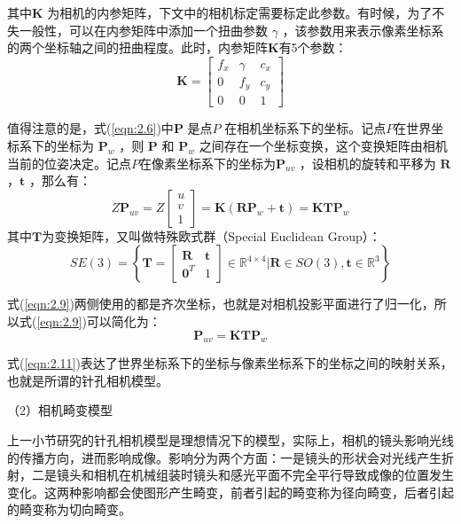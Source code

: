 其中$\bm{K} $ 为相机的内参矩阵，下文中的相机标定需要标定此参数。有时候，为了不失一般性，可以在内参矩阵中添加一个扭曲参数 $\gamma $ ，该参数用来表示像素坐标系的两个坐标轴之间的扭曲程度。此时，内参矩阵$\bm{K} $有5个参数：
\begin{equation}
\label{eqn:2.8}
\bm{K} = \left[\begin{array}{ccc}f_x&\gamma&c_x\\0&f_y&c_y\\0&0&1\end{array}\right]
\end{equation}

值得注意的是，式(\ref{eqn:2.6})中$\bm{P} $ 是点$P $ 在相机坐标系下的坐标。记点$P $在世界坐标系下的坐标为 $\bm{P}_w $ ，则  $\bm{P} $ 和  $\bm{P}_w $ 之间存在一个坐标变换，这个变换矩阵由相机当前的位姿决定。记点$P $在像素坐标系下的坐标为$\bm{P}_{uv} $ ，设相机的旋转和平移为 $\bm{R} $ ，$\bm{t} $ ，那么有：
\begin{equation}
\label{eqn:2.9}
Z \bm{P}_{u v}=Z \left[ \begin{array}{l}{u} \\ {v} \\ {1}\end{array}\right]
=\bm{K}\left(\bm{R} \bm{P}_{w}+\bm{t}\right)=\bm{K} \bm{T} \bm{P}_{w}
\end{equation}
其中$\bm{T} $为变换矩阵，又叫做特殊欧式群（Special Euclidean Group）：
\begin{equation}
\label{eqn:2.10}
S E(3)=\left\{
\bm{T}=\left[ \begin{array}{cc}{\bm{R}} & {\bm{t}} \\ {\bm{0}^{T}} & {1}\end{array}\right] \in \mathbb{R}^{4 \times 4} | 
\bm{R} \in S O(3), \bm{t} \in \mathbb{R}^{3}\right\} 
\end{equation}

式(\ref{eqn:2.9})两侧使用的都是齐次坐标，也就是对相机投影平面进行了归一化，所以式(\ref{eqn:2.9})可以简化为：
\begin{equation}
\label{eqn:2.11}
\boldsymbol{P}_{u v}=\boldsymbol{K} \boldsymbol{T} \boldsymbol{P}_{w}
\end{equation}

式(\ref{eqn:2.11})表达了世界坐标系下的坐标与像素坐标系下的坐标之间的映射关系，也就是所谓的针孔相机模型。

（2）相机畸变模型

上一小节研究的针孔相机模型是理想情况下的模型，实际上，相机的镜头影响光线的传播方向，进而影响成像。影响分为两个方面：一是镜头的形状会对光线产生折射，二是镜头和相机在机械组装时镜头和感光平面不完全平行导致成像的位置发生变化。这两种影响都会使图形产生畸变，前者引起的畸变称为径向畸变，后者引起的畸变称为切向畸变。

